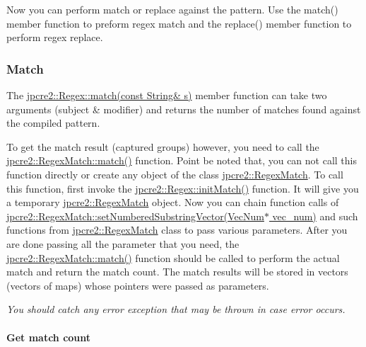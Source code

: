 Now you can perform match or replace against the pattern. Use the {\ttfamily match()} member function to preform regex match and the {\ttfamily replace()} member function to perform regex replace.\hypertarget{index_match}{}\subsubsection{Match}\label{index_match}
The {\ttfamily \hyperlink{classjpcre2_1_1Regex_a9ffbb6aa54cb97125f1b4211bc1d09a5}{jpcre2\+::\+Regex\+::match(const String\& s)}} member function can take two arguments (subject \& modifier) and returns the number of matches found against the compiled pattern.

To get the match result (captured groups) however, you need to call the {\ttfamily \hyperlink{classjpcre2_1_1RegexMatch_a5868aef3a146594ea1ebef34d122bb33}{jpcre2\+::\+Regex\+Match\+::match()}} function. Point be noted that, you can not call this function directly or create any object of the class {\ttfamily \hyperlink{classjpcre2_1_1RegexMatch}{jpcre2\+::\+Regex\+Match}}. To call this function, first invoke the {\ttfamily \hyperlink{classjpcre2_1_1Regex_a519b0915bf1163c6ce6a4d674b30cfcd}{jpcre2\+::\+Regex\+::init\+Match()}} function. It will give you a temporary {\ttfamily \hyperlink{classjpcre2_1_1RegexMatch}{jpcre2\+::\+Regex\+Match}} object. Now you can chain function calls of {\ttfamily \hyperlink{classjpcre2_1_1RegexMatch_a2c7efe1ec2e13827f670db4ecedcd0a0}{jpcre2\+::\+Regex\+Match\+::set\+Numbered\+Substring\+Vector(\+Vec\+Num$\ast$ vec\+\_\+num)}} and such functions from {\ttfamily \hyperlink{classjpcre2_1_1RegexMatch}{jpcre2\+::\+Regex\+Match}} class to pass various parameters. After you are done passing all the parameter that you need, the {\ttfamily \hyperlink{classjpcre2_1_1RegexMatch_a5868aef3a146594ea1ebef34d122bb33}{jpcre2\+::\+Regex\+Match\+::match()}} function should be called to perform the actual match and return the match count. The match results will be stored in vectors (vectors of maps) whose pointers were passed as parameters.

{\itshape You should catch any error exception that may be thrown in case error occurs.}\hypertarget{index_simple-match-count}{}\paragraph{Get match count}\label{index_simple-match-count}

